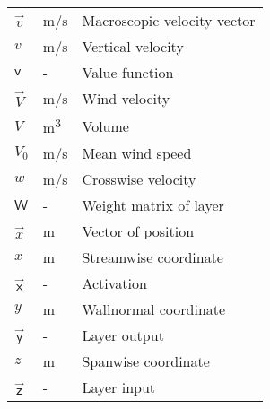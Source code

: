 \begin{longtable}{p{5cm}p{4cm}p{5cm}}
    $\vec{v}$               & \si{m/s}    	& Macroscopic velocity vector \\
	$v$                    	& \si{m/s}  	& Vertical velocity \\    
    $\mathsf{v}$			& \si{-}		& Value function \\
    $\vec{V}$				& \si{m/s}		& Wind velocity \\
    $V$						& \si{m\cubed}	& Volume \\
    $V_0$					& \si{m/s}		& Mean wind speed \\
    $w$                     & \si{m/s}    	& Crosswise velocity \\
    $\mathsf{W}$			& \si{-}		& Weight matrix of layer \\
    $\vec{x}$               & \si{m}     	 & Vector of position \\
    $x$                     & \si{m}     	 & Streamwise coordinate \\
    $\vec{\mathsf{x}}$		& \si{-}		& Activation \\
    $y$                     & \si{m}      	& Wallnormal coordinate \\
    $\vec{\mathsf{y}}$		& \si{-}		& Layer output \\	
    $z$                     & \si{m}      	& Spanwise coordinate \\
    $\vec{\mathsf{z}}$		& \si{-}		& Layer input \\
\end{longtable}

